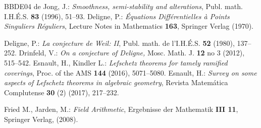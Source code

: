 \documentclass[12pt]{amsart}
\theoremstyle{plain}
\theoremstyle{definition}
\numberwithin{thm}{section}
\numberwithin{equation}{section}
\begin{document}
 \begin{thebibliography}{BBDE04}
 de Jong, J.: {\it Smoothness, semi-stability and alterations}, Publ. math. I.H.\'E.S. {\bf 83} (1996),
51--93.
 Deligne, P.: {\it \'Equations Diff\'erentielles \`a Points Singuliers R\'eguliers}, 
Lecture Notes in Mathematics  {\bf 163}, Springer Verlag (1970).


 Deligne, P.: {\it La conjecture de Weil: II}, Publ. math. de l'I.H.\'E.S. {\bf 52} (1980), 137--252.
 Drinfeld, V.: {\it On a conjecture of Deligne,} Mosc. Math. J. {\bf 12} no 3  (2012),  515--542. 
 Esnault, H., Kindler L.: {\it Lefschetz theorems for tamely ramified coverings}, Proc. of the AMS {\bf 144} (2016), 5071--5080. 
 Esnault, H.: {\it Survey on some aspects of Lefschetz theorems in algebraic geometry},  Revista Matem\'atica Complutense {\bf 30} (2) (2017), 217--232. 





 Fried M., Jarden, M.: \emph{Field Arithmetic}, Ergebnisse der Mathematik {\bf III 11}, Springer Verlag, (2008).




\end{thebibliography}
\end{document}
